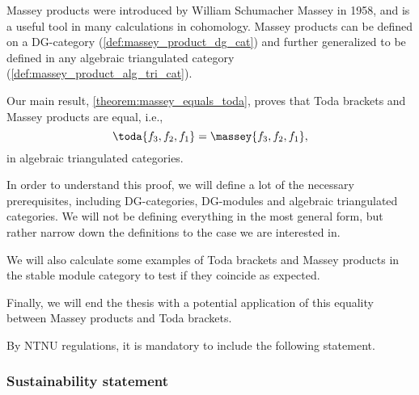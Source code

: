 Massey products were introduced by William Schumacher Massey in 1958, and is a useful tool in many calculations in cohomology. Massey products can be defined on a DG-category (\autoref{def:massey_product_dg_cat}) and further generalized to be defined in any algebraic triangulated category (\autoref{def:massey_product_alg_tri_cat}).

Our main result, \autoref{theorem:massey_equals_toda}, proves that Toda brackets and Massey products are equal, i.e.,
\[
    \toda{f_3, f_2, f_1} = \massey{f_3, f_2, f_1},
\]
in algebraic triangulated categories.

In order to understand this proof, we will define a lot of the necessary prerequisites, including DG-categories, DG-modules and algebraic triangulated categories. We will not be defining everything in the most general form, but rather narrow down the definitions to the case we are interested in.

We will also calculate some examples of Toda brackets and Massey products in the stable module category to test if they coincide as expected.

Finally, we will end the thesis with a potential application of this equality between Massey products and Toda brackets.

By NTNU regulations, it is mandatory to include the following statement.
\subsubsection{Sustainability statement}
